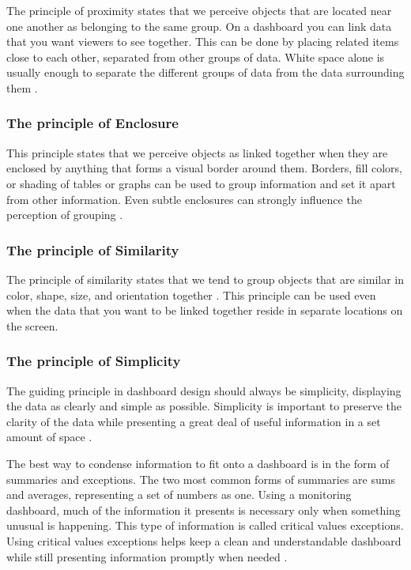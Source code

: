 The principle of proximity states that we perceive objects that are located near one another as belonging to the same group. On a dashboard you can link data that you want viewers to see together. This can be done by placing related items close to each other, separated from other groups of data. White space alone is usually enough to separate the different groups of data from the data surrounding them \autocite[p. 75]{FewDashboard}.

\subsubsection{The principle of Enclosure}
\label{subsubsec:principle_enclosure}


This principle states that we perceive objects as linked together when they are enclosed by anything that forms a visual border around them. Borders, fill colors, or shading of tables or graphs can be used to group information and set it apart from other information. Even subtle enclosures can strongly influence the perception of grouping \autocite[p. 76]{FewDashboard}.

\subsubsection{The principle of Similarity}
\label{subsubsec:principle_similarity}


The principle of similarity states that we tend to group objects that are similar in color, shape, size, and orientation together \autocite[p. 75-76]{FewDashboard}. This principle can be used even when the data that you want to be linked together reside in separate locations on the screen. 

\subsubsection{The principle of Simplicity}
\label{subsubsec:principle_simplicity}


The guiding principle in dashboard design should always be simplicity, displaying the data as clearly and simple as possible. Simplicity is important to preserve the clarity of the data while presenting a great deal of useful information in a set amount of space \autocite[p. 80-81]{FewDashboard}.

The best way to condense information to fit onto a dashboard is in the form of summaries and exceptions. The two most common forms of summaries are sums and averages, representing a set of numbers as one. Using a monitoring dashboard, much of the information it presents is necessary only when something unusual is happening. This type of information is called critical values exceptions. Using critical values exceptions helps keep a clean and understandable dashboard while still presenting information promptly when needed \autocite[p. 82]{FewDashboard}.

